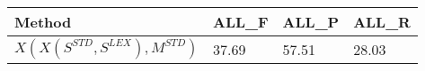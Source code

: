 \begin{table}[]
\centering
\begin{tabular}{@{\makebox[1.25em][l]{\rownumber\space}}llll@{}}
\toprule
 
\textbf{Method} & \textbf{ALL\_F} & \textbf{ALL\_P} & \textbf{ALL\_R} \\ \midrule

%
%
$X(X(S^{STD}, S^{LEX}), M^{STD})$  & 37.69           & 57.51           & 28.03\\ 
\midrule
%

\end{tabular}
\end{table}
